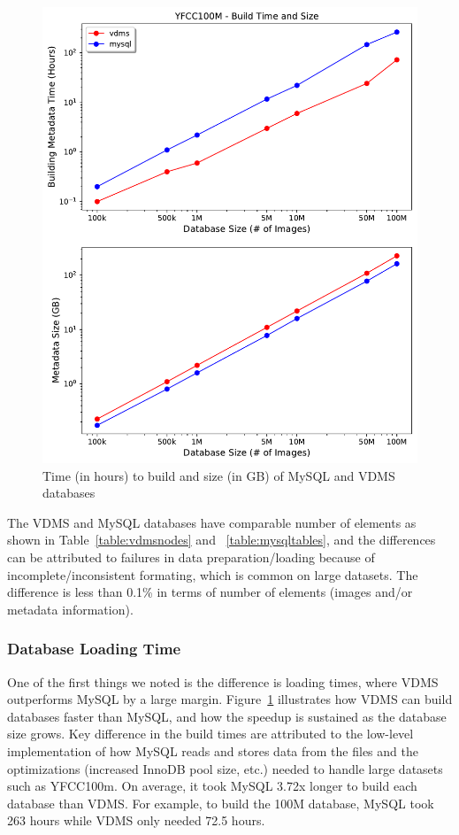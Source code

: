 \begin{figure}[]
\centering
\includegraphics[width=\columnwidth]{figures/db_time_size}
\caption{Time (in hours) to build and size (in GB) of MySQL and VDMS databases}
\label{fig:db_time_size}
\end{figure}

The VDMS and MySQL databases have comparable number of elements as shown in
Table~\ref{table:vdmsnodes} and ~\ref{table:mysqltables}, and the differences
can be attributed to failures in data preparation/loading because of
incomplete/inconsistent formating, which is common on large datasets.
The difference is less than 0.1\% in terms of number of elements (images and/or
metadata information).

\subsubsection{Database Loading Time}

One of the first things we noted is the difference is loading times,
where VDMS outperforms MySQL by a large margin.
Figure~\ref{fig:db_time_size} illustrates how VDMS can build databases
faster than MySQL, and how the speedup is sustained as the database size grows.
Key difference in the build times are attributed to the low-level
implementation of how MySQL reads and stores data from the files and the
optimizations (increased InnoDB pool size, etc.) needed
to handle large datasets such as YFCC100m.
On average, it took MySQL 3.72x longer to build each database than VDMS.
For example, to build the 100M database, MySQL took 263 hours
while VDMS only needed 72.5 hours.

